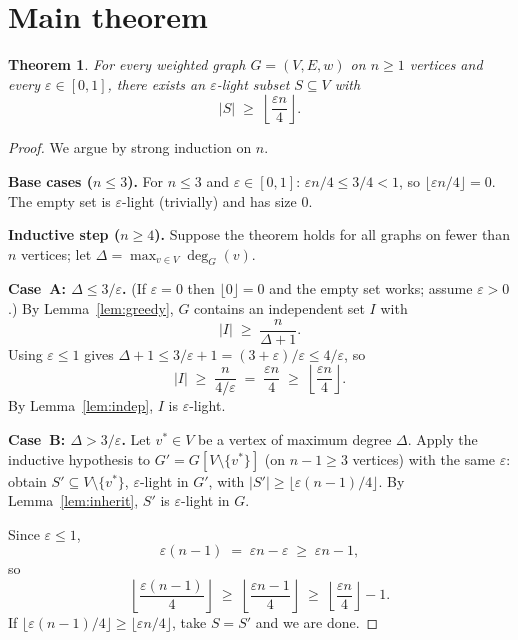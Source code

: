 \documentclass[12pt]{article}
\newtheorem{theorem}{Theorem}
\theoremstyle{definition}
\begin{document}
\section{Main theorem}

\begin{theorem}\label{thm:main}
For every weighted graph $G=(V,E,w)$ on $n\ge 1$ vertices and every
$\varepsilon\in[0,1]$, there exists an $\varepsilon$-light subset $S\subseteq V$ with
\[
   |S| \;\ge\; \left\lfloor \frac{\varepsilon n}{4} \right\rfloor.
\]
\end{theorem}

\begin{proof}
We argue by strong induction on $n$.

\medskip\noindent\textbf{Base cases ($n\le 3$).}
For $n\le 3$ and $\varepsilon\in[0,1]$: $\varepsilon n/4\le 3/4<1$, so
$\lfloor\varepsilon n/4\rfloor=0$.  The empty set is $\varepsilon$-light (trivially) and has
size $0$.

\medskip\noindent\textbf{Inductive step ($n\ge 4$).}
Suppose the theorem holds for all graphs on fewer than $n$ vertices; let
$\Delta=\max_{v\in V}\deg_G(v)$.

\medskip\noindent\textbf{Case~A: $\Delta\le 3/\varepsilon$.}
(If $\varepsilon=0$ then $\lfloor 0\rfloor=0$ and the empty set works; assume $\varepsilon>0$.)
By Lemma~\ref{lem:greedy}, $G$ contains an independent set $I$ with
\[
   |I| \;\ge\; \frac{n}{\Delta+1}.
\]
Using $\varepsilon\le 1$ gives $\Delta+1\le 3/\varepsilon+1=(3+\varepsilon)/\varepsilon\le 4/\varepsilon$,
so
\[
   |I| \;\ge\; \frac{n}{4/\varepsilon} \;=\; \frac{\varepsilon n}{4}
   \;\ge\; \left\lfloor\frac{\varepsilon n}{4}\right\rfloor.
\]
By Lemma~\ref{lem:indep}, $I$ is $\varepsilon$-light.

\medskip\noindent\textbf{Case~B: $\Delta>3/\varepsilon$.}
Let $v^*\in V$ be a vertex of maximum degree $\Delta$.
Apply the inductive hypothesis to $G'=G[V\setminus\{v^*\}]$ (on $n-1\ge 3$
vertices) with the same $\varepsilon$: obtain $S'\subseteq V\setminus\{v^*\}$,
$\varepsilon$-light in $G'$, with $|S'|\ge\lfloor\varepsilon(n-1)/4\rfloor$.
By Lemma~\ref{lem:inherit}, $S'$ is $\varepsilon$-light in $G$.

Since $\varepsilon\le 1$,
\[
   \varepsilon(n-1) \;=\; \varepsilon n - \varepsilon \;\ge\; \varepsilon n - 1,
\]
so
\begin{equation}\label{eq:floorineq}
   \left\lfloor\frac{\varepsilon(n-1)}{4}\right\rfloor
   \;\ge\; \left\lfloor\frac{\varepsilon n-1}{4}\right\rfloor
   \;\ge\; \left\lfloor\frac{\varepsilon n}{4}\right\rfloor - 1.
\end{equation}
If $\lfloor\varepsilon(n-1)/4\rfloor\ge\lfloor\varepsilon n/4\rfloor$, take $S=S'$ and we
are done.


\end{proof}
\end{document}
